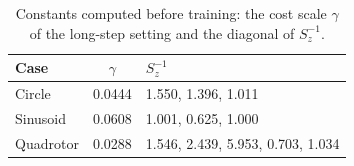 \begin{table}[ht]
\centering\small
\caption{Constants computed before training: the cost scale $\gamma$ of the long-step setting and the diagonal of $S_z^{-1}$.}
\label{tab:consts}
\begin{tabular}{@{}lcl@{}}
\toprule
Case & $\gamma$ & $S_z^{-1}$\\
\midrule
Circle & 0.0444 & 1.550, 1.396, 1.011\\
Sinusoid & 0.0608 & 1.001, 0.625, 1.000\\
Quadrotor & 0.0288 & 1.546, 2.439, 5.953, 0.703, 1.034\\
\bottomrule
\end{tabular}
\end{table}
